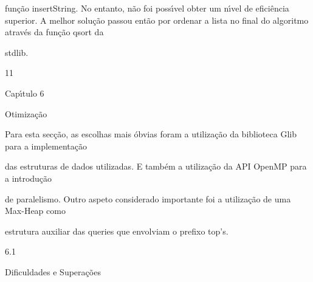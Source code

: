 \documentclass[a4paper,portrait,12pt]{article}
\begin{document}
\begin{flushleft}
função insertString. No entanto, não foi poss\i{}́vel obter um n\i{}́vel de eficiência superior. A melhor solução passou então por ordenar a lista no final do algoritmo através da função qsort da
\end{flushleft}


\begin{flushleft}
stdlib.
\end{flushleft}





11





\begin{flushleft}
\newpage
Cap\i{}́tulo 6
\end{flushleft}





\begin{flushleft}
Otimização
\end{flushleft}


\begin{flushleft}
Para esta secção, as escolhas mais óbvias foram a utilização da biblioteca Glib para a implementação
\end{flushleft}


\begin{flushleft}
das estruturas de dados utilizadas. E também a utilização da API OpenMP para a introdução
\end{flushleft}


\begin{flushleft}
de paralelismo. Outro aspeto considerado importante foi a utilização de uma Max-Heap como
\end{flushleft}


\begin{flushleft}
estrutura auxiliar das queries que envolviam o prefixo top's.
\end{flushleft}





6.1





\begin{flushleft}
Dificuldades e Superações
\end{flushleft}
\end{document}

